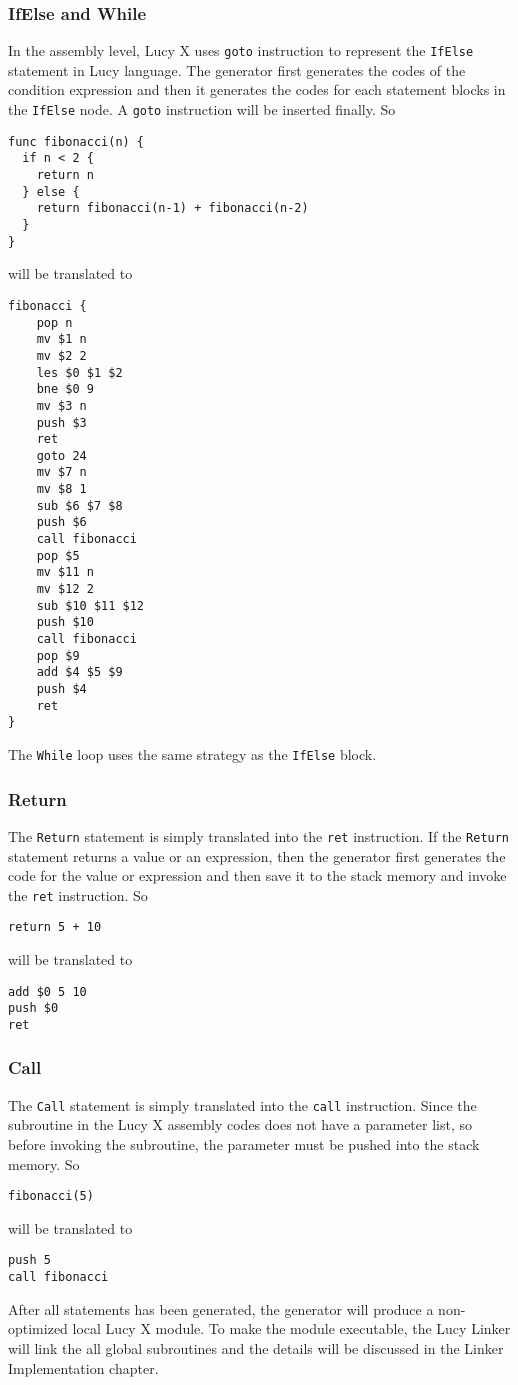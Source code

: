 \subsubsection{IfElse and While}
In the assembly level, Lucy X uses \texttt{goto} instruction to represent the \texttt{IfElse} statement in Lucy language. The generator first generates the codes of the condition expression and then it generates the codes for each statement blocks in the \texttt{IfElse} node. A \texttt{goto} instruction will be inserted finally. So
\begin{lstlisting}
func fibonacci(n) {
  if n < 2 {
    return n
  } else {
    return fibonacci(n-1) + fibonacci(n-2)
  }
}
\end{lstlisting}
will be translated to
\begin{lstlisting}[language=LucyX]
fibonacci {
	pop n
	mv $1 n
	mv $2 2
	les $0 $1 $2
	bne $0 9
	mv $3 n
	push $3
	ret
	goto 24
	mv $7 n
	mv $8 1
	sub $6 $7 $8
	push $6
	call fibonacci
	pop $5
	mv $11 n
	mv $12 2
	sub $10 $11 $12
	push $10
	call fibonacci
	pop $9
	add $4 $5 $9
	push $4
	ret
}
\end{lstlisting}
The \texttt{While} loop uses the same strategy as the \texttt{IfElse} block.
\subsubsection{Return}
The \texttt{Return} statement is simply translated into the \texttt{ret} instruction. If the \texttt{Return} statement returns a value or an expression, then the generator first generates the code for the value or expression and then save it to the stack memory and invoke the \texttt{ret} instruction. So
\begin{lstlisting}
return 5 + 10
\end{lstlisting}
will be translated to
\begin{lstlisting}[language=LucyX]
add $0 5 10
push $0
ret
\end{lstlisting}
\subsubsection{Call}
The \texttt{Call} statement is simply translated into the \texttt{call} instruction. Since the subroutine in the Lucy X assembly codes does not have a parameter list, so before invoking the subroutine, the parameter must be pushed into the stack memory. So
\begin{lstlisting}
fibonacci(5)
\end{lstlisting}
will be translated to
\begin{lstlisting}[language=LucyX]
push 5
call fibonacci
\end{lstlisting}
After all statements has been generated, the generator will produce a non-optimized local Lucy X module. To make the module executable, the Lucy Linker will link the all global subroutines and the details will be discussed in the Linker Implementation chapter.
